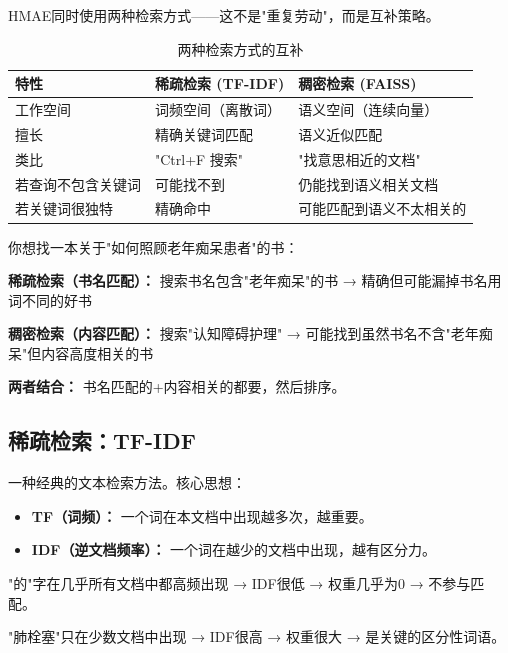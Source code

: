 \documentclass[11pt,a4paper]{ctexart}
\begin{document}
HMAE同时使用两种检索方式——这不是"重复劳动"，而是互补策略。

\begin{table}[H]
\centering
\small
\begin{tabular}{lll}
\toprule
\textbf{特性} & \textbf{稀疏检索 (TF-IDF)} & \textbf{稠密检索 (FAISS)} \\
\midrule
工作空间 & 词频空间（离散词） & 语义空间（连续向量） \\
擅长 & 精确关键词匹配 & 语义近似匹配 \\
类比 & "Ctrl+F 搜索" & "找意思相近的文档" \\
若查询不包含关键词 & 可能找不到 & 仍能找到语义相关文档 \\
若关键词很独特 & 精确命中 & 可能匹配到语义不太相关的 \\
\bottomrule
\end{tabular}
\caption{两种检索方式的互补}
\end{table}

\begin{exambox}
你想找一本关于"如何照顾老年痴呆患者"的书：

\textbf{稀疏检索（书名匹配）：} 搜索书名包含"老年痴呆"的书 → 精确但可能漏掉书名用词不同的好书

\textbf{稠密检索（内容匹配）：} 搜索"认知障碍护理" → 可能找到虽然书名不含"老年痴呆"但内容高度相关的书

\textbf{两者结合：} 书名匹配的+内容相关的都要，然后排序。
\end{exambox}

\subsection{稀疏检索：TF-IDF}

\begin{defbox}
一种经典的文本检索方法。核心思想：
\begin{itemize}[nosep]
\item \textbf{TF（词频）：} 一个词在本文档中出现越多次，越重要。
\item \textbf{IDF（逆文档频率）：} 一个词在越少的文档中出现，越有区分力。
\end{itemize}
\end{defbox}

\begin{exambox}
"的"字在几乎所有文档中都高频出现 → IDF很低 → 权重几乎为0 → 不参与匹配。

"肺栓塞"只在少数文档中出现 → IDF很高 → 权重很大 → 是关键的区分性词语。
\end{exambox}
\end{document}
